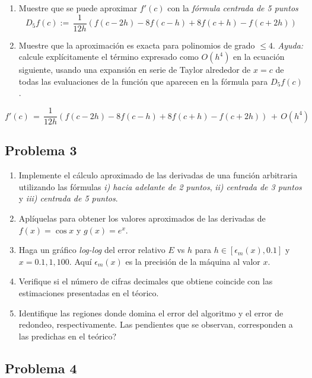 \documentclass[11pt]{article}
\begin{document}
\begin{enumerate}
\def\labelenumi{\arabic{enumi}.}
\item
  Muestre que se puede aproximar \(f'(c)\) con la \emph{fórmula centrada
  de 5 puntos} \[
  D_5f(c) := \,\frac{1}{12 h} \left(f(c-2 h)-8 f(c-h)+8 f(c+h)-f(c+2 h)
  \right)
  \]
\item
  Muestre que la aproximación es exacta para polinomios de grado
  \(\le 4\). \emph{Ayuda:} calcule explícitamente el término expresado
  como \(O(h^4)\) en la ecuación siguiente, usando una expansión en
  serie de Taylor alrededor de \(x=c\) de todas las evaluaciones de la
  función que aparecen en la fórmula para \(D_5f(c)\).
\end{enumerate}

\[
f'(c)\,=\,\frac{1}{12 h} \left(f(c-2 h)-8 f(c-h)+8 f(c+h)-f(c+2 h)
\right)\,+\,O(h^4)
\]

    \hypertarget{problema-3}{%
\subsection*{Problema 3}\label{problema-3}}

\begin{enumerate}
\def\labelenumi{\arabic{enumi}.}
\item
  Implemente el cálculo aproximado de las derivadas de una función
  arbitraria utilizando las fórmulas \emph{i) hacia adelante de 2
  puntos}, \emph{ii) centrada de 3 puntos} y \emph{iii) centrada de 5
  puntos}.
\item
  Aplíquelas para obtener los valores aproximados de las derivadas de
  \(f(x)=\cos x\) y \(g(x)=e^x\).
\item
  Haga un gráfico \emph{log-log} del error relativo \(E\) vs \(h\) para
  \(h\in [\epsilon_m(x),0.1]\) y \(x=0.1, 1, 100\). Aquí
  \(\epsilon_m(x)\) es la precisión de la máquina al valor \(x\).
\item
  Verifique si el número de cifras decimales que obtiene coincide con
  las estimaciones presentadas en el téorico.
\item
  Identifique las regiones donde domina el error del algoritmo y el
  error de redondeo, respectivamente. Las pendientes que se observan,
  corresponden a las predichas en el teórico?
\end{enumerate}

    \hypertarget{problema-4}{%
\subsection*{Problema 4}\label{problema-4}}
\end{document}

